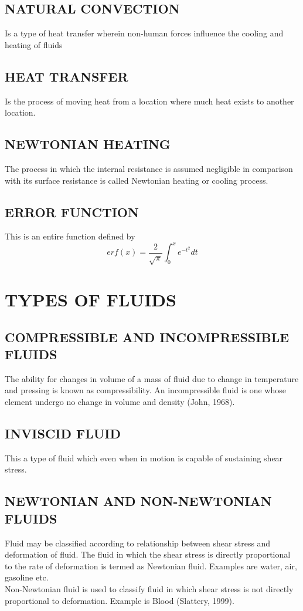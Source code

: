 \documentclass[11pt]{report}
\begin{document}
	\subsection{NATURAL CONVECTION}
	Is a type of heat transfer wherein non-human forces influence the cooling and heating of fluids
	
	\subsection{HEAT TRANSFER}
	Is the process of moving heat from a location where much heat exists to another location.
	
	\subsection{NEWTONIAN HEATING}
	The process in which the internal resistance is assumed negligible in comparison with its surface resistance is called Newtonian heating or cooling process.
	
	\subsection{ERROR FUNCTION}
	This is an entire function defined by
	\begin{equation*}
		er f(x) = \frac{2}{\sqrt{\pi}}\int_0^x e^{-t^2}dt
	\end{equation*}
	
	
	\section{TYPES OF FLUIDS}
	\subsection{COMPRESSIBLE AND INCOMPRESSIBLE FLUIDS}
	The ability for changes in volume of a mass of fluid due to change in temperature and pressing is known as compressibility. An incompressible fluid is one whose element undergo no change in volume and density (John, 1968).
	
	\subsection{INVISCID FLUID}
	This a type of fluid which even when in motion is capable of sustaining shear stress.
	
	\subsection{NEWTONIAN AND NON-NEWTONIAN FLUIDS}
	Fluid may be classified according to relationship between shear stress and deformation of fluid. The fluid in which the shear stress is directly proportional to the rate of deformation is termed as Newtonian fluid. Examples are water, air, gasoline etc.\\
	Non-Newtonian fluid is used to classify fluid in which shear stress is not directly proportional to deformation. Example is Blood (Slattery, 1999).
	
\end{document}

